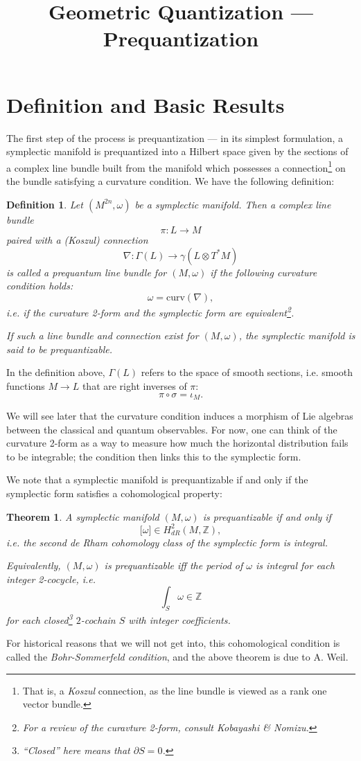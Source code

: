 \documentclass{tufte-handout}
\title{Geometric Quantization --- Prequantization}
\newtheorem{thrm}{Theorem}
\newtheorem{defn}{Definition}
\begin{document}
\section{Definition and Basic Results}
The first step of the process is prequantization --- in its simplest formulation, a symplectic manifold is prequantized into a Hilbert space given by the sections of a complex line bundle built from the manifold which possesses a connection\footnote{That is, a \emph{Koszul} connection, as the line bundle is viewed as a rank one vector bundle.} on the bundle satisfying a curvature condition. We have the following definition:
\begin{defn}
Let $(M^{2n},\omega)$ be a symplectic manifold. Then a complex line bundle
$$
\pi: L \to M
$$
paired with a (Koszul) connection
$$
\nabla: \Gamma(L) \to \gamma(L \otimes T^*M)
$$
is called a \emph{prequantum line bundle} for $(M,\omega)$ if the following curvature condition holds:
$$
\omega = \mathrm{curv}(\nabla),
$$
i.e. if the curvature 2-form and the symplectic form are equivalent\footnote{For a review of the curavture 2-form, consult Kobayashi \& Nomizu.}.

If such a line bundle and connection exist for $(M,\omega)$, the symplectic manifold is said to be \emph{prequantizable}.
\end{defn}
In the definition above, $\Gamma(L)$ refers to the space of smooth sections, i.e. smooth functions $M \to L$ that are right inverses of $\pi$:
$$
\pi \circ \sigma = \iota_M.
$$

We will see later that the curvature condition induces a morphism of Lie algebras between the classical and quantum observables. For now, one can think of the curvature 2-form as a way to measure how much the horizontal distribution fails to be integrable; the condition then links this to the symplectic form.

We note that a symplectic manifold is prequantizable if and only if the symplectic form satisfies a cohomological property:
\begin{thrm}
A symplectic manifold $(M,\omega)$ is prequantizable if and only if
$$
\biggl[\omega\biggr] \in H_{dR}^2(M,\mathbb{Z}),
$$
i.e. the second de Rham cohomology class of the symplectic form is integral.

Equivalently, $(M,\omega)$ is prequantizable iff the period of $\omega$ is integral for each integer 2-cocycle, i.e.
$$
\int_S \omega \in \mathbb{Z}
$$
for each closed\footnote{``Closed'' here means that $\partial S = 0$.} $2$-cochain $S$ with integer coefficients.
\end{thrm}
For historical reasons that we will not get into, this cohomological condition is called the \emph{Bohr-Sommerfeld condition}, and the above theorem is due to A. Weil.
\end{document}
